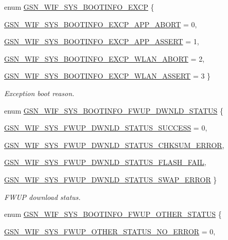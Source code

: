 \begin{DoxyCompactItemize}
enum \hyperlink{a00639_ga9447df4a60ba9be14d372720213b2c23}{GSN\_\-WIF\_\-SYS\_\-BOOTINFO\_\-EXCP} \{ \par
\hyperlink{a00639_gga9447df4a60ba9be14d372720213b2c23abc4bb520cfdd57e022e7e5e2b2a5f555}{GSN\_\-WIF\_\-SYS\_\-BOOTINFO\_\-EXCP\_\-APP\_\-ABORT} =  0, 
\par
\hyperlink{a00639_gga9447df4a60ba9be14d372720213b2c23a488c8769b3249bdb8329bb1bbdaaea86}{GSN\_\-WIF\_\-SYS\_\-BOOTINFO\_\-EXCP\_\-APP\_\-ASSERT} =  1, 
\par
\hyperlink{a00639_gga9447df4a60ba9be14d372720213b2c23acb5b82fa9415893bb5fd62f0c514d290}{GSN\_\-WIF\_\-SYS\_\-BOOTINFO\_\-EXCP\_\-WLAN\_\-ABORT} =  2, 
\par
\hyperlink{a00639_gga9447df4a60ba9be14d372720213b2c23a51c2d92fe86618628ee3208796512b03}{GSN\_\-WIF\_\-SYS\_\-BOOTINFO\_\-EXCP\_\-WLAN\_\-ASSERT} =  3
 \}
\begin{DoxyCompactList}\small\item\em Exception boot reason. \end{DoxyCompactList}\item 
enum \hyperlink{a00639_ga39cb2f02fc6abae8ae5a431aa24944c0}{GSN\_\-WIF\_\-SYS\_\-BOOTINFO\_\-FWUP\_\-DWNLD\_\-STATUS} \{ \par
\hyperlink{a00639_gga39cb2f02fc6abae8ae5a431aa24944c0a20c7f10721b308522548859ef16917e7}{GSN\_\-WIF\_\-SYS\_\-FWUP\_\-DWNLD\_\-STATUS\_\-SUCCESS} =  0, 
\par
\hyperlink{a00639_gga39cb2f02fc6abae8ae5a431aa24944c0a9dd90ed3f631644b1d936a9844d7eaab}{GSN\_\-WIF\_\-SYS\_\-FWUP\_\-DWNLD\_\-STATUS\_\-CHKSUM\_\-ERROR}, 
\par
\hyperlink{a00639_gga39cb2f02fc6abae8ae5a431aa24944c0a6fcf93a4efae3973b0142a839ebb654b}{GSN\_\-WIF\_\-SYS\_\-FWUP\_\-DWNLD\_\-STATUS\_\-FLASH\_\-FAIL}, 
\par
\hyperlink{a00639_gga39cb2f02fc6abae8ae5a431aa24944c0a6b82080d96a8397aceb85f9ecc03bf78}{GSN\_\-WIF\_\-SYS\_\-FWUP\_\-DWNLD\_\-STATUS\_\-SWAP\_\-ERROR}
 \}
\begin{DoxyCompactList}\small\item\em FWUP download status. \end{DoxyCompactList}\item 
enum \hyperlink{a00639_ga8df4566faa9edce0748124e2d08c1efe}{GSN\_\-WIF\_\-SYS\_\-BOOTINFO\_\-FWUP\_\-OTHER\_\-STATUS} \{ \par
\hyperlink{a00639_gga8df4566faa9edce0748124e2d08c1efea7bd77a34da3f7cf36884f4ed738101c5}{GSN\_\-WIF\_\-SYS\_\-FWUP\_\-OTHER\_\-STATUS\_\-NO\_\-ERROR} =  0, 

\end{DoxyCompactItemize}
